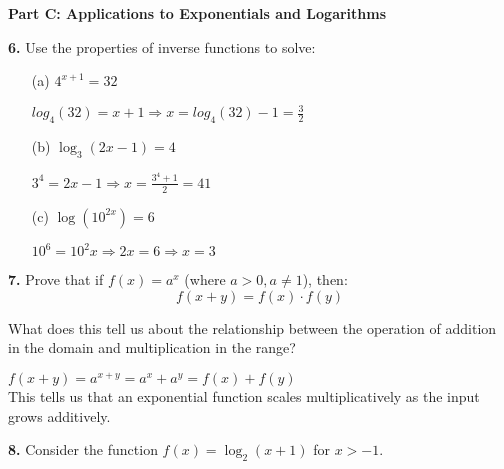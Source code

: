 \documentclass[12pt]{article}
\begin{document}
\newpage

\textbf{Part C: Applications to Exponentials and Logarithms}

\textbf{6.} Use the properties of inverse functions to solve:

\begin{enumerate}
\item[(a)] $4^{x+1} = 32$
\\[8pt]
\begin{minipage}[t][2cm][t]{\linewidth}
    $\displaystyle log_4(32)=x+1 \Rightarrow x=log_4(32)-1=\frac{3}{2}$
\end{minipage}

\item[(b)] $\log_3(2x - 1) = 4$
\\[8pt]
\begin{minipage}[t][2cm][t]{\linewidth}
    $\displaystyle 3^4=2x-1 \Rightarrow x=\frac{3^4+1}{2}=41$
\end{minipage}

\item[(c)] $\log(10^{2x}) = 6$
\\[8pt]
\begin{minipage}[t][2cm][t]{\linewidth}
    $\displaystyle 10^6=10^2x \Rightarrow 2x=6 \Rightarrow x=3$
\end{minipage}
\end{enumerate}

\textbf{7.} Prove that if $f(x) = a^x$ (where $a > 0, a \neq 1$), then:
$$f(x + y) = f(x) \cdot f(y)$$

What does this tell us about the relationship between the operation of addition in the domain and multiplication in the range?
\\[8pt]
\begin{minipage}[t][4cm][t]{\linewidth}
    $\displaystyle f(x+y)=a^{x+y}=a^x+a^y=f(x)+f(y)$
    \\[8pt] This tells us that an exponential function scales multiplicatively as the input grows additively.
\end{minipage}

\textbf{8.} Consider the function $f(x) = \log_2(x + 1)$ for $x > -1$.
\end{document}
